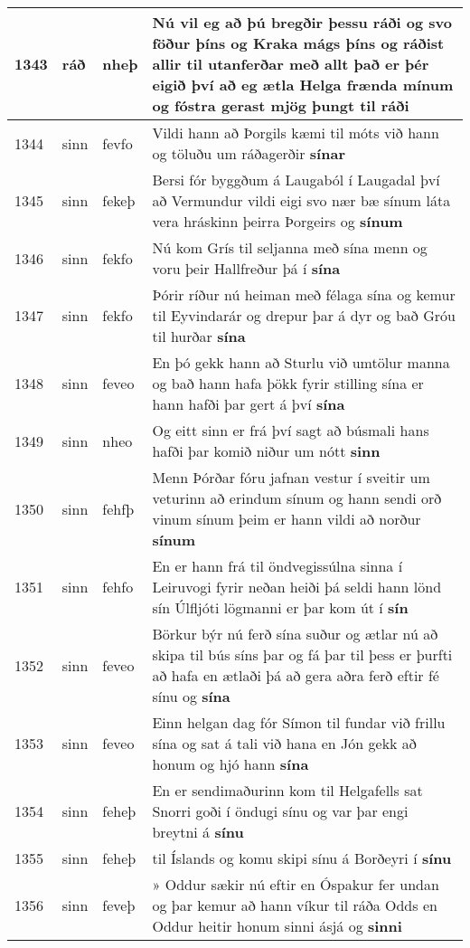 \documentclass{article}
\begin{document}
\begin{longtable}{p{1cm}|p{1cm}|p{1cm}|p{13cm}}
\hline
1343&ráð&nheþ&Nú vil eg að þú bregðir þessu ráði og svo föður þíns og Kraka mágs þíns og ráðist allir til utanferðar með allt það er þér eigið því að eg ætla Helga frænda mínum og fóstra gerast mjög þungt til \textbf{ráði} \\
\hline
1344&sinn&fevfo&Vildi hann að Þorgils kæmi til móts við hann og töluðu um ráðagerðir \textbf{sínar} \\
\hline
1345&sinn&fekeþ&Bersi fór byggðum á Laugaból í Laugadal því að Vermundur vildi eigi svo nær bæ sínum láta vera hráskinn þeirra Þorgeirs og \textbf{sínum} \\
\hline
1346&sinn&fekfo&Nú kom Grís til seljanna með sína menn og voru þeir Hallfreður þá í \textbf{sína} \\
\hline
1347&sinn&fekfo&Þórir ríður nú heiman með félaga sína og kemur til Eyvindarár og drepur þar á dyr og bað Gróu til hurðar \textbf{sína} \\
\hline
1348&sinn&feveo&En þó gekk hann að Sturlu við umtölur manna og bað hann hafa þökk fyrir stilling sína er hann hafði þar gert á því \textbf{sína} \\
\hline
1349&sinn&nheo&Og eitt sinn er frá því sagt að búsmali hans hafði þar komið niður um nótt \textbf{sinn} \\
\hline
1350&sinn&fehfþ&Menn Þórðar fóru jafnan vestur í sveitir um veturinn að erindum sínum og hann sendi orð vinum sínum þeim er hann vildi að norður \textbf{sínum} \\
\hline
1351&sinn&fehfo&En er hann frá til öndvegissúlna sinna í Leiruvogi fyrir neðan heiði þá seldi hann lönd sín Úlfljóti lögmanni er þar kom út í \textbf{sín} \\
\hline
1352&sinn&feveo&Börkur býr nú ferð sína suður og ætlar nú að skipa til bús síns þar og fá þar til þess er þurfti að hafa en ætlaði þá að gera aðra ferð eftir fé sínu og \textbf{sína} \\
\hline
1353&sinn&feveo&Einn helgan dag fór Símon til fundar við frillu sína og sat á tali við hana en Jón gekk að honum og hjó hann \textbf{sína} \\
\hline
1354&sinn&feheþ&En er sendimaðurinn kom til Helgafells sat Snorri goði í öndugi sínu og var þar engi breytni á \textbf{sínu} \\
\hline
1355&sinn&feheþ&til Íslands og komu skipi sínu á Borðeyri í \textbf{sínu} \\
\hline
1356&sinn&feveþ&» Oddur sækir nú eftir en Óspakur fer undan og þar kemur að hann víkur til ráða Odds en Oddur heitir honum sinni ásjá og \textbf{sinni} \\

\end{longtable}
\end{document}
